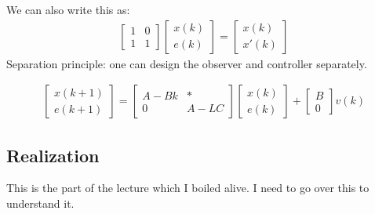\documentclass[a4paper,11pt]{article}
\begin{document}
		We can also write this as:
		\begin{gather}
			\begin{bmatrix}
				1 & 0\\
				1 & 1
			\end{bmatrix}
			\begin{bmatrix}
				x(k)\\
				e(k)
			\end{bmatrix}
			= 
			\begin{bmatrix}
				x(k)\\
				x'(k)
			\end{bmatrix}
		\end{gather}
		Separation principle: one can design the observer and controller separately.  

		\begin{gather}
			\begin{bmatrix}
				x(k+1)\\
				e(k+1)
			\end{bmatrix}=
			\begin{bmatrix}
				A-Bk & *\\
				0 &  A-LC
			\end{bmatrix}
			\begin{bmatrix}
				x(k)\\
				e(k)
			\end{bmatrix}
			+
			\begin{bmatrix}
				B\\
				0
			\end{bmatrix} v(k)
		\end{gather}

		\subsection{Realization}
			This is the part of the lecture which I boiled alive. I need to go over this to understand it.
\end{document}
